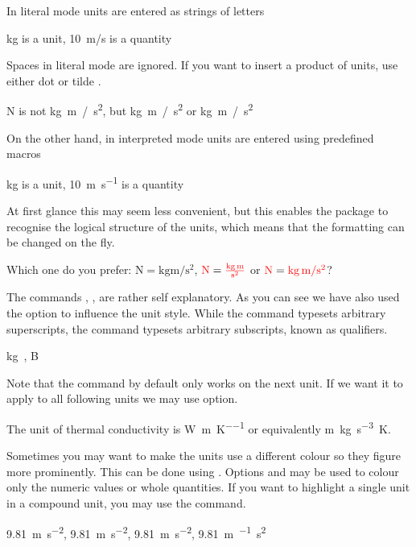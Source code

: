 In literal mode units are entered as strings of letters
\begin{example}
\unit{kg} is a unit,
\qty{10}{m/s} is a quantity
\end{example}
Spaces in literal mode are ignored. If you want to insert a product of units,
use either dot  or tilde \ai{\~{}}.
\begin{example}
\unit{N} is 
not \unit{kg m / s^2},
but \unit{kg.m / s^2}
or \unit{kg~m / s^2}
\end{example}

On the other hand, in interpreted mode units are entered using predefined
macros
\begin{example}
\unit{\kilo\gram} is a unit,
\qty{10}{\metre\per\second}
is a quantity
\end{example}
At first glance this may seem less convenient, but this enables the package to
recognise the logical structure of the units, which means that the formatting
can be changed on the fly.
\begin{example}[examplewidth=0.8\linewidth, vertical_mode]
Which one do you prefer:
\(\unit{\newton} = \unit{
  \kilo\gram\metre\per\square\second}\),
\(\unit{\newton} = \unit[per-mode = fraction]{
  \kilo\gram\metre\per\second\squared}\) or
\(\unit{\N} = \unit[per-mode = symbol]{
  \kg\m\per\s\tothe{2}}\)?
\end{example}
The commands , ,  are rather self explanatory. As you
can see we have also used the  option to influence the unit
style. While the command  typesets arbitrary superscripts, the
command  typesets arbitrary subscripts, known as qualifiers.
\begin{example}
\unit{\kg{}},
\unit{\bel{}}
\end{example}

Note that the  command by default only works on the next unit. If we
want it to apply to all following units we may use  option.
\begin{example}[examplewidth=0.7\linewidth, vertical_mode]
The unit of thermal conductivity is
\unit{\watt\per\metre\per\kelvin}
or equivalently
\unit[sticky-per]{\m\kg\per\s\cubed\K}. 
\end{example}

Sometimes you may want to make the units use a different colour so they figure more prominently. This can be done using . Options
 and  may be used to colour only the numeric
values or whole quantities. If you want to highlight a single unit in a
compound unit, you may use the  command.
\begin{example}[examplewidth=0.8\linewidth, vertical_mode]
\qty[unit-color = red   ]{9.81}{\m\per\s\squared},
\qty[number-color = blue]{9.81}{\m\per\s\squared},
\qty[color = green      ]{9.81}{\m\per\s\squared},
\qty{9.81}{\m\per{}\s\squared}
\end{example}

